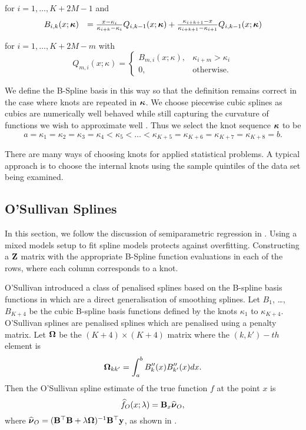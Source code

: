 \noindent for $i = 1, \ldots, K + 2M -1$ and
$$
\begin{array}{rl}
	B_{i, k}(x; {\boldsymbol \kappa}) &= \frac{x - \kappa_i}{\kappa_{i + k} - \kappa_i} Q_{i, k-1} (x; {\boldsymbol \kappa}) + 
										\frac{\kappa_{i + k + 1} - x}{\kappa_{i + k + 1} - \kappa_{i + 1}} Q_{i, k-1} (x; {\boldsymbol \kappa})
\end{array}
$$

\noindent for $i = 1, \ldots, K + 2 M - m$ with
$$
Q_{m, i}(x; \kappa) =
\begin{cases}
B_{m, i}(x; \kappa),& \kappa_{i + m} > \kappa_i \\
0, & \text{otherwise}.
\end{cases}
$$

We define the B-Spline basis in this way so that the definition remains correct
in the case where knots are repeated in ${\boldsymbol \kappa}$. We choose piecewise cubic
splines as cubics are numerically well behaved while still capturing the
curvature of functions we wish to approximate well
\citep{Press:2007:NRE:1403886}. Thus we select the knot sequence ${\boldsymbol \kappa}$ to be
$$
a = \kappa_1 = \kappa_2 = \kappa_3 = \kappa_4 < \kappa_5 < \ldots < \kappa_{K+5} = \kappa_{K+6} = \kappa_{K+7} = \kappa_{K+8} = b.
$$

There are many ways of choosing knots for applied statistical problems. A
typical approach is to choose the internal knots using the sample quintiles of
the data set being examined.

\subsection{O'Sullivan Splines}

In this section, we follow the discussion of semiparametric regression in
\cite{ruppert_wand_carroll_2003}.  Using a mixed models setup to fit spline
models protects against overfitting. Constructing a ${\bf Z}$ matrix with the
appropriate B-Spline function evaluations in each of the rows, where each column
corresponds to a knot.

O'Sullivan introduced a class of penalised splines based on the B-spline basis
functions in \cite{OSullivan1986} which are a direct generalisation of smoothing
splines. Let $B_1$, \ldots, $B_{K+4}$ be the cubic B-spline basis functions
defined by the knots $\kappa_1$ to $\kappa_{K+4}$. O'Sullivan splines are
penalised splines which are penalised using a penalty matrix. Let ${\boldsymbol \Omega}$ be
the $(K+4) \times (K+4)$ matrix where the $(k, k')-th$ element is \[
{\boldsymbol \Omega}_{k k'} = \int_a^b B''_k(x) B''_{k'}(x) dx. \] Then the O'Sullivan spline
estimate of the true function $f$ at the point $x$ is \begin{equation*}
\widehat{f}_O(x; \lambda) = {\bf B}_x \widehat{{\boldsymbol \nu}}_O, \end{equation*} where
$\widehat{{\boldsymbol \nu}}_O = ({\bf B}^\top {\bf B} + \lambda {\boldsymbol\Omega})^{-1} {\bf B}^\top {\bf y}$, as
shown in \cite{ruppert_wand_carroll_2003}.

